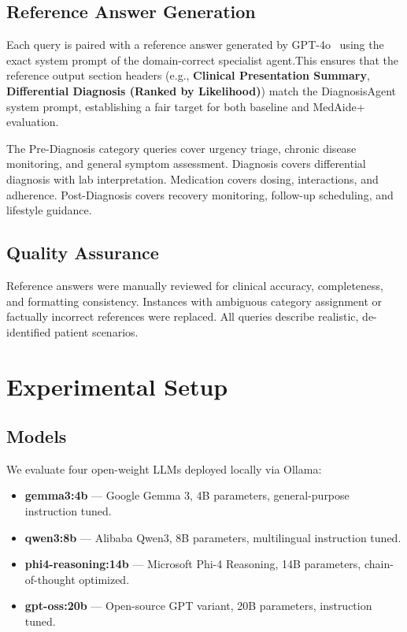 \documentclass[conference]{IEEEtran}
\begin{document}
\subsection{Reference Answer Generation}

Each query is paired with a reference answer generated by GPT-4o~\cite{openai2023gpt4}
using the exact system prompt of the domain-correct specialist agent.This ensures that
the reference output section headers (e.g., \textbf{Clinical Presentation Summary},
\textbf{Differential Diagnosis (Ranked by Likelihood)}) match the DiagnosisAgent
system prompt, establishing a fair target for both baseline and MedAide+ evaluation.

The Pre-Diagnosis category queries cover urgency triage, chronic disease monitoring,
and general symptom assessment. Diagnosis covers differential diagnosis with lab
interpretation. Medication covers dosing, interactions, and adherence. Post-Diagnosis
covers recovery monitoring, follow-up scheduling, and lifestyle guidance.

\subsection{Quality Assurance}

Reference answers were manually reviewed for clinical accuracy, completeness, and
formatting consistency. Instances with ambiguous category assignment or factually
incorrect references were replaced. All queries describe realistic, de-identified
patient scenarios.

\section{Experimental Setup}
\label{sec:setup}

\subsection{Models}

We evaluate four open-weight LLMs deployed locally via Ollama:
\begin{itemize}
  \item \textbf{gemma3:4b} — Google Gemma 3, 4B parameters, general-purpose instruction tuned.
  \item \textbf{qwen3:8b} — Alibaba Qwen3, 8B parameters, multilingual instruction tuned.
  \item \textbf{phi4-reasoning:14b} — Microsoft Phi-4 Reasoning, 14B parameters, chain-of-thought optimized.
  \item \textbf{gpt-oss:20b} — Open-source GPT variant, 20B parameters, instruction tuned.
\end{itemize}
\end{document}
